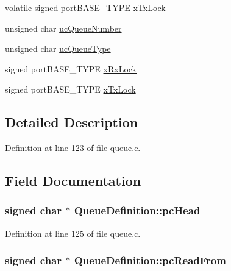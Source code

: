 \begin{DoxyCompactItemize}
\item 
\hyperlink{group___c_m_s_i_s___core___instruction_interface_gad7d93af13046b0378601b85c8c16673b}{volatile} signed port\-B\-A\-S\-E\-\_\-\-T\-Y\-P\-E \hyperlink{struct_queue_definition_a295eddccfd1515f1fe5b12b9e9ec81e0}{x\-Tx\-Lock}
\item 
unsigned char \hyperlink{struct_queue_definition_a13f1f6255bf39265592b38e5cd2d15db}{uc\-Queue\-Number}
\item 
unsigned char \hyperlink{struct_queue_definition_a4fe5b767259ad9ea324ddb12e62cf243}{uc\-Queue\-Type}
\item 
signed port\-B\-A\-S\-E\-\_\-\-T\-Y\-P\-E \hyperlink{struct_queue_definition_ad7c6ccbee34deed4a438354a0d3cf765}{x\-Rx\-Lock}
\item 
signed port\-B\-A\-S\-E\-\_\-\-T\-Y\-P\-E \hyperlink{struct_queue_definition_a295eddccfd1515f1fe5b12b9e9ec81e0}{x\-Tx\-Lock}
\end{DoxyCompactItemize}


\subsection{Detailed Description}


Definition at line 123 of file queue.\-c.



\subsection{Field Documentation}
\hypertarget{struct_queue_definition_a8b980b74f28a8d1fd0c2ab860df8133d}{
\subsubsection[{pc\-Head}]{\setlength{\rightskip}{0pt plus 5cm}signed char $\ast$ Queue\-Definition\-::pc\-Head}}\label{struct_queue_definition_a8b980b74f28a8d1fd0c2ab860df8133d}


Definition at line 125 of file queue.\-c.

\hypertarget{struct_queue_definition_a4f066b3c19c50a0d706c92bc4ce5c6c8}{
\subsubsection[{pc\-Read\-From}]{\setlength{\rightskip}{0pt plus 5cm}signed char $\ast$ Queue\-Definition\-::pc\-Read\-From}}\label{struct_queue_definition_a4f066b3c19c50a0d706c92bc4ce5c6c8}


